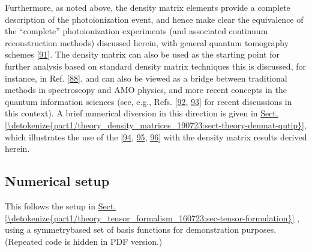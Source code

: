 \documentclass[letterpaper,table,10pt,english]{jupyterBook}
\begin{document}
\sphinxAtStartPar
Furthermore, as noted above, the density matrix elements provide a complete description of the photoionization event, and hence make clear the equivalence of the “complete” photoionization experiments (and associated continuum reconstruction methods) discussed herein, with general quantum tomography schemes {[}\hyperlink{cite.backmatter/bibliography:id764}{91}{]}. The density matrix can also be used as the starting point for further analysis based on standard density matrix techniques \sphinxhyphen{} this is discussed, for instance, in Ref. {[}\hyperlink{cite.backmatter/bibliography:id525}{88}{]}, and can also be viewed as a bridge between traditional methods in spectroscopy and AMO physics, and more recent concepts in the quantum information sciences (see, e.g., Refs. {[}\hyperlink{cite.backmatter/bibliography:id901}{92}, \hyperlink{cite.backmatter/bibliography:id964}{93}{]} for recent discussions in this context). A brief numerical diversion in this direction is given in \hyperref[\detokenize{part1/theory_density_matrices_190723:sect-theory-denmat-qutip}]{Sect.\@ \ref{\detokenize{part1/theory_density_matrices_190723:sect-theory-denmat-qutip}}}, which illustrates the use of the  {[}\hyperlink{cite.backmatter/bibliography:id689}{94}, \hyperlink{cite.backmatter/bibliography:id690}{95}, \hyperlink{cite.backmatter/bibliography:id813}{96}{]} with the density matrix results derived herein.


\subsection{Numerical setup}
\label{\detokenize{part1/theory_density_matrices_190723:numerical-setup}}
\sphinxAtStartPar
This follows the setup in \hyperref[\detokenize{part1/theory_tensor_formalism_160723:sec-tensor-formulation}]{Sect.\@ \ref{\detokenize{part1/theory_tensor_formalism_160723:sec-tensor-formulation}}} {\hyperref[\detokenize{part1/theory_tensor_formalism_160723:sec-tensor-formulation}]{}}, using a symmetry\sphinxhyphen{}based set of basis functions for demonstration purposes. (Repeated code is hidden in PDF version.)
\end{document}
